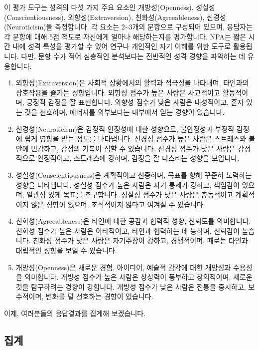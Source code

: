 \documentclass[
]{book}
\begin{document}
이 평가 도구는 성격의 다섯 가지 주요 요소인 개방성(Openness), 성실성(Conscientiousness), 외향성(Extraversion), 친화성(Agreeableness), 신경성(Neuroticism)을 측정합니다. 각 요소는 2\textasciitilde3개의 문항으로 구성되어 있으며, 응답자는 각 문항에 대해 5점 척도로 자신에게 얼마나 해당하는지를 평가합니다.
NPA는 짧은 시간 내에 성격 특성을 평가할 수 있어 연구나 개인적인 자기 이해를 위한 도구로 활용됩니다. 다만, 문항 수가 적어 심층적인 분석보다는 전반적인 성격 경향을 파악하는 데 유용합니다.

\begin{enumerate}
\def\labelenumi{\arabic{enumi}.}
\item
  외향성(Extraversion)은 사회적 상황에서의 활력과 적극성을 나타내며, 타인과의 상호작용을 즐기는 성향입니다. 외향성 점수가 높은 사람은 사교적이고 활동적이며, 긍정적 감정을 잘 표현합니다. 외향성 점수가 낮은 사람은 내성적이고, 혼자 있는 것을 선호하며, 에너지를 외부보다는 내부에서 얻는 경향이 있습니다.
\item
  신경성(Neuroticism)은 감정적 안정성에 대한 성향으로, 불안정성과 부정적 감정에 쉽게 영향을 받는 정도를 나타냅니다. 신경성 점수가 높은 사람은 스트레스와 불안에 민감하고, 감정의 기복이 심할 수 있습니다. 신경성 점수가 낮은 사람은 감정적으로 안정적이고, 스트레스에 강하며, 감정을 잘 다스리는 성향을 보입니다.
\item
  성실성(Conscientiousness)은 계획적이고 신중하며, 목표를 향해 꾸준히 노력하는 성향을 나타냅니다. 성실성 점수가 높은 사람은 자기 통제가 강하고, 책임감이 있으며, 일관성 있게 목표를 추구합니다. 성실성 점수가 낮은 사람은 충동적이고 계획적이지 않은 성향이 있으며, 조직적이지 않다고 여겨질 수 있습니다.
\item
  친화성(Agreeableness)은 타인에 대한 공감과 협력적 성향, 신뢰도를 의미합니다. 친화성 점수가 높은 사람은 이타적이고, 타인과 협력하는 데 능하며, 신뢰감이 높습니다. 친화성 점수가 낮은 사람은 자기주장이 강하고, 경쟁적이며, 때로는 타인과 대립적인 성향을 보일 수 있습니다.
\item
  개방성(Openness)은 새로운 경험, 아이디어, 예술적 감각에 대한 개방성과 수용성을 의미합니다. 개방성 점수가 높은 사람은 상상력이 풍부하고 창의적이며, 새로운 것을 탐구하려는 경향이 강합니다. 개방성 점수가 낮은 사람은 전통을 중시하고, 보수적이며, 변화를 덜 선호하는 경향이 있습니다.
\end{enumerate}

이제, 여러분들의 응답결과를 집계해 보겠습니다.

\subsection{집계}\label{uxc9d1uxacc4-35}
\end{document}
